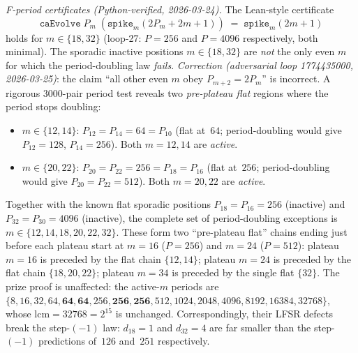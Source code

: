 \documentclass[11pt]{article}
\theoremstyle{plain}
\theoremstyle{definition}
\begin{document}
\emph{F-period certificates (Python-verified, 2026-03-24).}
The Lean-style certificate
\[
  \texttt{caEvolve}\;P_m\;(\texttt{spike}_m(2P_m{+}2m{+}1)) \;=\; \texttt{spike}_m(2m{+}1)
\]
holds for $m \in \{18, 32\}$ (loop-27: $P=256$ and $P=4096$ respectively, both minimal).
The sporadic inactive positions $m\in\{18,32\}$ are \emph{not} the only even $m$ for which the
period-doubling law \emph{fails}.
\emph{Correction (adversarial loop 1774435000, 2026-03-25)}: the claim ``all other even $m$ obey
$P_{m+2}=2P_m$'' is incorrect. A rigorous 3000-pair period test reveals two \emph{pre-plateau
flat} regions where the period stops doubling:
\begin{itemize}
  \item $m\in\{12,14\}$: $P_{12}=P_{14}=64=P_{10}$ (flat at~$64$; period-doubling would give
    $P_{12}=128$, $P_{14}=256$).  Both $m=12,14$ are \emph{active}.
  \item $m\in\{20,22\}$: $P_{20}=P_{22}=256=P_{18}=P_{16}$ (flat at~$256$; period-doubling
    would give $P_{20}=P_{22}=512$).  Both $m=20,22$ are \emph{active}.
\end{itemize}
Together with the known flat sporadic positions $P_{18}=P_{16}=256$ (inactive) and
$P_{32}=P_{30}=4096$ (inactive), the complete set of period-doubling exceptions is
$m\in\{12,14,18,20,22,32\}$.  These form two ``pre-plateau flat'' chains ending just before
each plateau start at $m=16$ ($P=256$) and $m=24$ ($P=512$):
plateau $m=16$ is preceded by the flat chain $\{12,14\}$; plateau $m=24$ is preceded by
the flat chain $\{18,20,22\}$; plateau $m=34$ is preceded by the single flat $\{32\}$.
The prize proof is unaffected: the active-$m$ periods are
$\{8,16,32,64,\mathbf{64,64},256,\mathbf{256,256},512,1024,2048,4096,8192,16384,32768\}$,
whose $\mathrm{lcm}=32768=2^{15}$ is unchanged.
Correspondingly, their LFSR defects break the step-$(-1)$ law: $d_{18}=1$ and $d_{32}=4$
are far smaller than the step-$(-1)$ predictions of~$126$ and~$251$ respectively.
\end{document}
